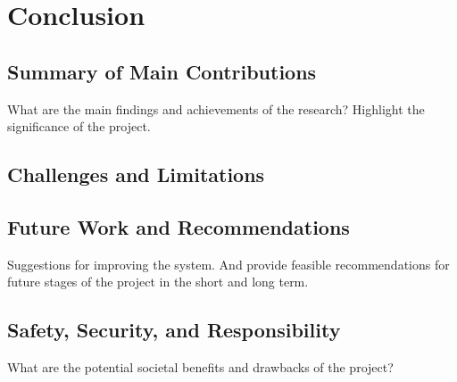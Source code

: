 
\section{Conclusion}

\subsection{Summary of Main Contributions}
What are the main findings and achievements of the research? Highlight the significance of the project.

\subsection{Challenges and Limitations}

\subsection{Future Work and Recommendations}
Suggestions for improving the system. And provide feasible recommendations for future stages of the project in the short and long term.

\subsection{Safety, Security, and Responsibility}
What are the potential societal benefits and drawbacks of the project?
